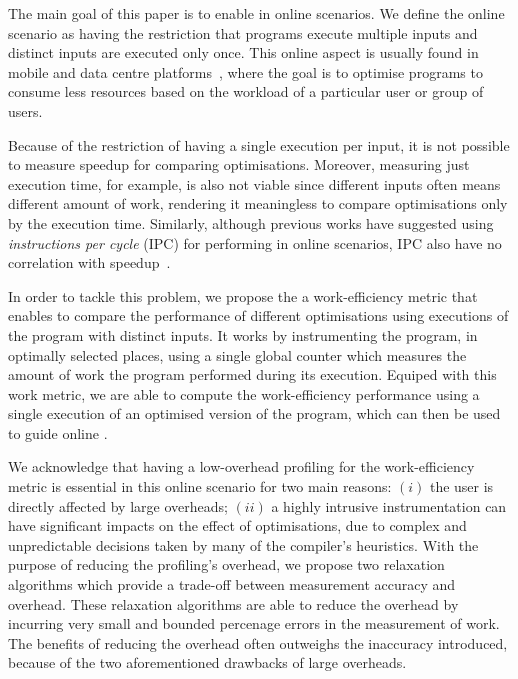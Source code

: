 The main goal of this paper is to enable {\itercomp} in online scenarios.
We define the online scenario as having the restriction that programs execute
multiple inputs and distinct inputs are executed only once.
This online aspect is usually found in mobile and data centre
platforms~\citep{chen12b,fang15,mpeis16}, where the goal is to optimise programs
to consume less resources based on the workload of a particular user or group of
users.

Because of the restriction of having a single execution per input, it is not
possible to measure speedup for comparing optimisations.
Moreover, measuring just execution time, for example, is also not viable since
different inputs often means different amount of work,
rendering it meaningless to compare optimisations only by the execution time.
Similarly, although previous works have suggested using
\textit{instructions per cycle} (IPC) for performing {\itercomp} in online
scenarios, IPC also have no correlation with speedup~\citep{fursin07}.

In order to tackle this problem, we propose the a work-efficiency metric that
enables to compare the performance of different optimisations using executions
of the program with distinct inputs.
It works by instrumenting the program, in optimally selected places, using a
single global counter which measures the amount of work the program performed
during its execution.
Equiped with this work metric, we are able to compute the work-efficiency
performance using a single execution of an optimised version of the program,
which can then be used to guide online {\itercomp}.

We acknowledge that having a low-overhead profiling for the work-efficiency
metric is essential in this online scenario for two main reasons:
$(i)$ the user is directly affected by large overheads;
$(ii)$ a highly intrusive instrumentation can have significant impacts on the
effect of optimisations, due to complex and unpredictable decisions taken by
many of the compiler's heuristics.
With the purpose of reducing the profiling's overhead, we propose two relaxation
algorithms which provide a trade-off between measurement accuracy and overhead.
These relaxation algorithms are able to reduce the overhead by incurring very
small and bounded percenage errors in the measurement of work.
The benefits of reducing the overhead often outweighs the inaccuracy introduced,
because of the two aforementioned drawbacks of large overheads.

